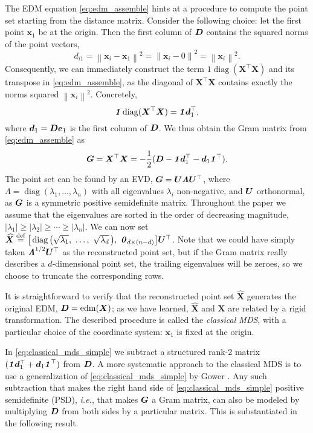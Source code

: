 \documentclass[10pt,double]{IEEEtran}
\providecommand{\abs}[1]{\left|#1\right|}
\providecommand{\norm}[1]{\left\lVert#1\right\rVert}
\providecommand{\bydef}{\overset{\text{def}}{=}}
\providecommand{\diag}{\mathop{\mathrm{diag}}}
\renewcommand{\vec}[1]{\ensuremath{\boldsymbol{#1}}}
\providecommand{\mat}[1]{\ensuremath{\boldsymbol{#1}}}
\providecommand{\wh}[1]{\ensuremath{\widehat{#1}}}
\providecommand{\mX}{\mat{X}}\providecommand{\mY}{\mat{Y}}
\providecommand{\ve}{\vec{e}} \providecommand{\vf}{\vec{f}}
\providecommand{\vx}{\vec{x}} \providecommand{\vy}{\vec{y}}
\newcommand{\EDM}{\ensuremath{\mathrm{edm}}}
\newcommand{\vone}{\ensuremath{\vec{\mathit{1}}}}
\renewcommand{\vzero}{\ensuremath{\vec{\mathit{0}}}}
\newcommand{\T}{\ensuremath{\top}}
\newcommand{\mLambda}{\bm{\mathit{\Lambda}}}
\renewcommand{\diag}{\mathop{\mathrm{diag}}}
\newcommand{\rev}[1]{{#1}}
\begin{document}
The EDM equation \eqref{eq:edm_assemble} hints at a procedure to compute the
point set starting from the distance matrix. 
Consider the following choice: let the first point $\vx_1$  be at the origin.
Then the first column of $\mD$ contains the squared norms of the point
vectors,
\begin{equation}
	d_{i1} = \norm{\vx_i - \vx_1}^2 = \norm{\vx_i - \vzero}^2 = \norm{\vx_i}^2.
\end{equation}
Consequently, we can immediately construct the term $\vone \diag(\mX^\T \mX)$
and its transpose in \eqref{eq:edm_assemble}, as the diagonal of $\mX^\T \mX$ contains exactly the norms squared $\norm{\vx_i}^2$. Concretely, 
\begin{equation}
	\vone \diag(\mX^\T \mX) = \vone \vd_1^\T,
\end{equation}
where $\vd_1 = \mD \ve_1$ is the first column of $\mD$. We thus obtain the Gram matrix
from 
\eqref{eq:edm_assemble} as
\begin{equation}
	\label{eq:classical_mds_simple}
	\mG = \mX^\T \mX = -\frac{1}{2}(\mD - \vone \vd_1^\T - \vd_1 \vone^\T).
\end{equation}
The point set can be found by an EVD, $\mG = \mU
\mLambda \mU^\T$, where $\mLambda = \diag(\lambda_1, \ldots, \lambda_n)$ with all eigenvalues
$\lambda_i$ non-negative, and $\mU$ orthonormal, as $\mG$ is a symmetric
positive semidefinite matrix. Throughout the paper we assume that the
eigenvalues are sorted in the order of decreasing magnitude, $\abs{\lambda_1}
\geq \abs{\lambda_2} \geq \cdots \geq \abs{\lambda_n}$. We can now set
$\wh{\mX} \bydef \big[ \diag \big( \sqrt{\lambda_1},\ \ldots,\
\sqrt{\lambda_d}\, \big), \ \vzero_{d \times (n-d)} \big] \mU^\T$. Note that
we could have simply taken $\mLambda^{1/2}
\mU^\T$ as the reconstructed point set, but if the Gram matrix really
describes a $d$-dimensional point set, the trailing eigenvalues will be
zeroes, so we choose to truncate the corresponding rows.

\rev{It is straightforward to verify that the reconstructed point set
$\wh{\mX}$ generates the original EDM, $\mD = \EDM(\mX)$; as we have learned,
$\wh{\mX}$ and $\mX$ are related by a rigid transformation. The described procedure
is called the \emph{classical MDS}, with a particular choice of the coordinate
system: $\vx_1$ is fixed at the origin.}

In \eqref{eq:classical_mds_simple} we subtract a structured rank-2 matrix
$(\vone \vd_1^\T + \vd_1 \vone^\T)$ from $\mD$. A more systematic approach to
the classical MDS is to use a generalization of
\eqref{eq:classical_mds_simple} by Gower
\cite{gower1982}. Any such subtraction that makes the right hand side of
\eqref{eq:classical_mds_simple} positive semidefinite (PSD), \emph{i.e.}, that
makes $\mG$ a Gram matrix, can also be modeled by multiplying $\mD$ from both
sides by a particular matrix. This is substantiated in the following result.
\end{document}
